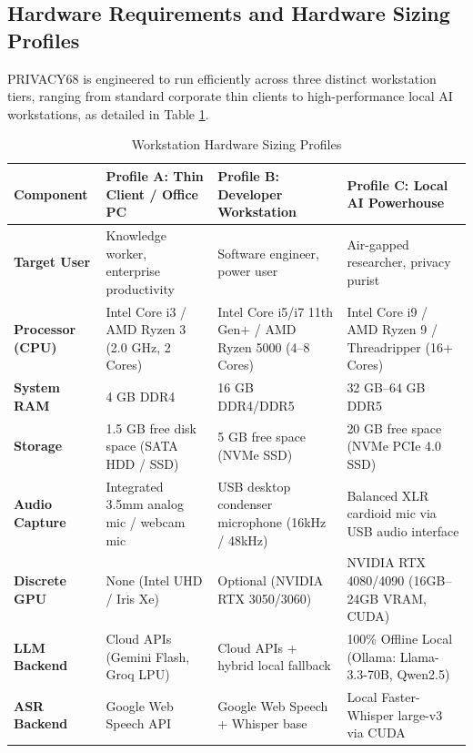 \subsection{Hardware Requirements and Hardware Sizing Profiles}
PRIVACY68 is engineered to run efficiently across three distinct workstation tiers, ranging from standard corporate thin clients to high-performance local AI workstations, as detailed in Table \ref{tab:hardware_profiles}.

\begin{table}[htbp]
\centering
\small
\caption{Workstation Hardware Sizing Profiles}
\label{tab:hardware_profiles}
\begin{tabularx}{\textwidth}{|p{2.8cm}|X|X|X|}
\hline
\textbf{Component} & \textbf{Profile A: Thin Client / Office PC} & \textbf{Profile B: Developer Workstation} & \textbf{Profile C: Local AI Powerhouse} \\ \hline
\textbf{Target User} & Knowledge worker, enterprise productivity & Software engineer, power user & Air-gapped researcher, privacy purist \\ \hline
\textbf{Processor (CPU)} & Intel Core i3 / AMD Ryzen 3 (2.0 GHz, 2 Cores) & Intel Core i5/i7 11th Gen+ / AMD Ryzen 5000 (4--8 Cores) & Intel Core i9 / AMD Ryzen 9 / Threadripper (16+ Cores) \\ \hline
\textbf{System RAM} & 4 GB DDR4 & 16 GB DDR4/DDR5 & 32 GB--64 GB DDR5 \\ \hline
\textbf{Storage} & 1.5 GB free disk space (SATA HDD / SSD) & 5 GB free space (NVMe SSD) & 20 GB free space (NVMe PCIe 4.0 SSD) \\ \hline
\textbf{Audio Capture} & Integrated 3.5mm analog mic / webcam mic & USB desktop condenser microphone (16kHz / 48kHz) & Balanced XLR cardioid mic via USB audio interface \\ \hline
\textbf{Discrete GPU} & None (Intel UHD / Iris Xe) & Optional (NVIDIA RTX 3050/3060) & NVIDIA RTX 4080/4090 (16GB--24GB VRAM, CUDA) \\ \hline
\textbf{LLM Backend} & Cloud APIs (Gemini Flash, Groq LPU) & Cloud APIs + hybrid local fallback & 100\% Offline Local (Ollama: Llama-3.3-70B, Qwen2.5) \\ \hline
\textbf{ASR Backend} & Google Web Speech API & Google Web Speech + Whisper base & Local Faster-Whisper large-v3 via CUDA \\ \hline
\end{tabularx}
\end{table}


